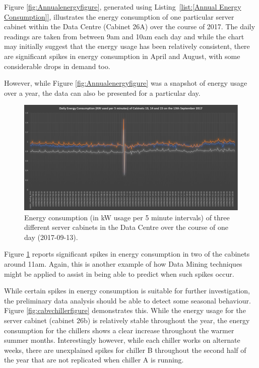 \documentclass[12pt]{scrartcl}
\begin{document}
Figure \ref{fig:Annualenergyfigure}, generated using Listing~\ref{list:[Annual Energy Consumption]}, illustrates the energy consumption of one particular server cabinet within the Data Centre (Cabinet 26A) over the course of 2017. The daily readings are taken from between 9am and 10am each day and while the chart may initially suggest that the energy usage has been relatively consistent, there are significant spikes in energy consumption in April and August, with some considerable drops in demand too. 

However, while Figure \ref{fig:Annualenergyfigure} was a snapshot of energy usage over a year, the data can also be presented for a particular day. 

\begin{figure}[H]
  \caption{Energy consumption (in kW usage per 5 minute intervals) of three different server cabinets in the Data Centre over the course of one day (2017-09-13).}
  \label{fig:Dailyenergyfigure}
  \centering
    \includegraphics[scale=0.35]{Daily_energy_consumption_of_cab131415}
\end{figure}
   
Figure \ref{fig:Dailyenergyfigure} reports significant spikes in energy consumption in two of the cabinets around 11am. Again, this is another example of how Data Mining techniques might be applied to assist in being able to predict when such spikes occur. 

While certain spikes in energy consumption is suitable for further investigation, the preliminary data analysis should be able to detect some seasonal behaviour. Figure \ref{fig:cabvchillerfigure} demonstrates this. While the energy usage for the server cabinet (cabinet 26b) is relatively stable throughout the year, the energy consumption for the chillers shows a clear increase throughout the warmer summer months. Interestingly however, while each chiller works on alternate weeks, there are unexplained spikes for chiller B throughout the second half of the year that are not replicated when chiller A is running. 
\end{document}
